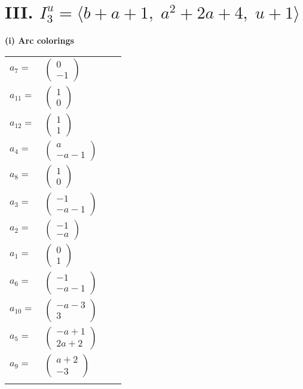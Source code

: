 \documentclass[1p]{elsarticle_modified}
\theoremstyle{definition}
\begin{document}
\centering \section*{III. $I^u_{3}= \langle b+a+1,\;a^2+2 a+4,\;u+1 \rangle$}
\flushleft \textbf{(i) Arc colorings}\\
\begin{tabular}{m{7pt} m{180pt} m{7pt} m{180pt} }
\flushright $a_{7}=$&$\begin{pmatrix}0\\-1\end{pmatrix}$ \\
\flushright $a_{11}=$&$\begin{pmatrix}1\\0\end{pmatrix}$ \\
\flushright $a_{12}=$&$\begin{pmatrix}1\\1\end{pmatrix}$ \\
\flushright $a_{4}=$&$\begin{pmatrix}a\\- a-1\end{pmatrix}$ \\
\flushright $a_{8}=$&$\begin{pmatrix}1\\0\end{pmatrix}$ \\
\flushright $a_{3}=$&$\begin{pmatrix}-1\\- a-1\end{pmatrix}$ \\
\flushright $a_{2}=$&$\begin{pmatrix}-1\\- a\end{pmatrix}$ \\
\flushright $a_{1}=$&$\begin{pmatrix}0\\1\end{pmatrix}$ \\
\flushright $a_{6}=$&$\begin{pmatrix}-1\\- a-1\end{pmatrix}$ \\
\flushright $a_{10}=$&$\begin{pmatrix}- a-3\\3\end{pmatrix}$ \\
\flushright $a_{5}=$&$\begin{pmatrix}- a+1\\2 a+2\end{pmatrix}$ \\
\flushright $a_{9}=$&$\begin{pmatrix}a+2\\-3\end{pmatrix}$\\&\end{tabular}
\end{document}

